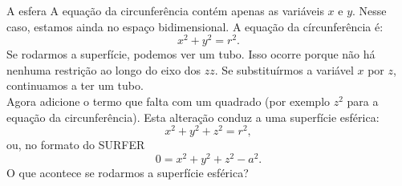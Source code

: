 \begin{surferPage}[A Esfera]{A esfera}
A equa\c c\~ao da circunfer\^encia cont\'em apenas as vari\'aveis $x$ e $y$. Nesse caso, estamos ainda no espa\c co bidimensional.
A equa\c c\~ao da c\'ircunfer\^encia \'e:
\[x^2+y^2=r^2.\]
Se   rodarmos a superf\'icie,  podemos ver um tubo. Isso ocorre porque n\~ao h\'a nenhuma restri\c c\~ao ao longo do eixo dos $zz$. Se  substitu\'irmos a vari\'avel $x$ por $z$,   continuamos a ter um tubo.\\
Agora adicione o termo que falta com um quadrado (por exemplo $z^2$ para a equa\c c\~ao da circunfer\^encia). 
Esta altera\c c\~ao conduz  a uma superf\'icie esf\'erica:
\[x^2+y^2+z^2=r^2,\]
ou, no formato do SURFER
\[0=x^2+y^2+z^2-a^2.\]
O que acontece se  rodarmos a superf\'icie esf\'erica?
\end{surferPage}
